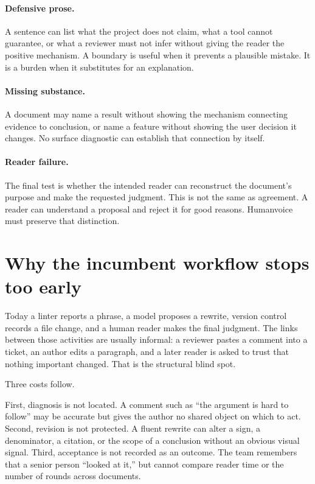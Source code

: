 \paragraph{Defensive prose.} A sentence can list what the project does not
claim, what a tool cannot guarantee, or what a reviewer must not infer without
giving the reader the positive mechanism. A boundary is useful when it prevents
a plausible mistake. It is a burden when it substitutes for an explanation.

\paragraph{Missing substance.} A document may name a result without showing
the mechanism connecting evidence to conclusion, or name a feature without
showing the user decision it changes. No surface diagnostic can establish that
connection by itself.

\paragraph{Reader failure.} The final test is whether the intended reader can
reconstruct the document's purpose and make the requested judgment. This is not
the same as agreement. A reader can understand a proposal and reject it for
good reasons. Humanvoice must preserve that distinction.

\section{Why the incumbent workflow stops too early}

Today a linter reports a phrase, a model proposes a rewrite, version control
records a file change, and a human reader makes the final judgment. The links
between those activities are usually informal: a reviewer pastes a comment into
a ticket, an author edits a paragraph, and a later reader is asked to trust
that nothing important changed. That is the structural blind spot.

Three costs follow.

First, diagnosis is not located. A comment such as ``the argument is hard to
follow'' may be accurate but gives the author no shared object on which to act.
Second, revision is not protected. A fluent rewrite can alter a sign, a
denominator, a citation, or the scope of a conclusion without an obvious visual
signal. Third, acceptance is not recorded as an outcome. The team remembers
that a senior person ``looked at it,'' but cannot compare reader time or the
number of rounds across documents.


